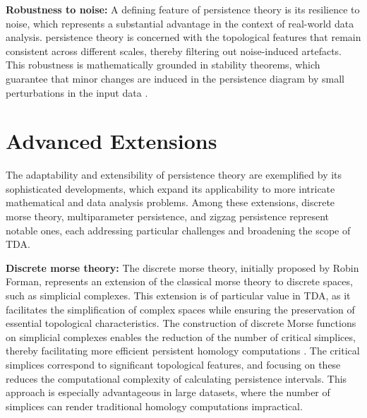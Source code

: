 \textbf{Robustness to noise:} A defining feature of persistence theory is its resilience to noise, which represents a substantial advantage in the context of real-world data analysis. persistence theory is concerned with the topological features that remain consistent across different scales, thereby filtering out noise-induced artefacts. This robustness is mathematically grounded in stability theorems, which guarantee that minor changes are induced in the persistence diagram by small perturbations in the input data \cite{Cohen-Steiner2007}.

\section{Advanced Extensions}
The adaptability and extensibility of persistence theory are exemplified by its sophisticated developments, which expand its applicability to more intricate mathematical and data analysis problems. Among these extensions, discrete morse theory, multiparameter persistence, and zigzag persistence represent notable ones, each addressing particular challenges and broadening the scope of TDA.

\textbf{Discrete morse theory:} The discrete morse theory, initially proposed by Robin Forman, represents an extension of the classical morse theory to discrete spaces, such as simplicial complexes. This extension is of particular value in TDA, as it facilitates the simplification of complex spaces while ensuring the preservation of essential topological characteristics. The construction of discrete Morse functions on simplicial complexes enables the reduction of the number of critical simplices, thereby facilitating more efficient persistent homology computations \cite{Forman2002}. The critical simplices correspond to significant topological features, and focusing on these reduces the computational complexity of calculating persistence intervals. This approach is especially advantageous in large datasets, where the number of simplices can render traditional homology computations impractical.

